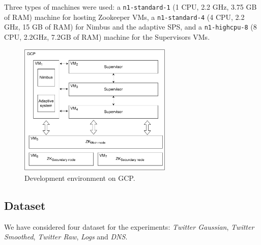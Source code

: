 Three types of machines were used: a \texttt{n1-standard-1} (1 CPU, 2.2 GHz, 3.75 GB of RAM) machine for hosting Zookeeper VMs, a \texttt{n1-standard-4} (4 CPU, 2.2 GHz, 15 GB of RAM) for Nimbus and the adaptive SPS, and a \texttt{n1-highcpu-8} (8 CPU, 2.2GHz, 7.2GB of RAM) machine for the Supervisors VMs.

\begin{figure}[!ht]
      \centering
     \includegraphics[width=0.65\textwidth]{figures/exp/GCP.pdf}
     \caption{Development environment on GCP.}
     \label{fig:exp-testbed}
\end{figure} 
 
\subsection{Dataset}
\label{exp:dataset}
We have considered four dataset for the experiments: \textit{Twitter Gaussian}, \textit{Twitter Smoothed}, \textit{Twitter Raw}, \textit{Logs} and \textit{DNS}.

